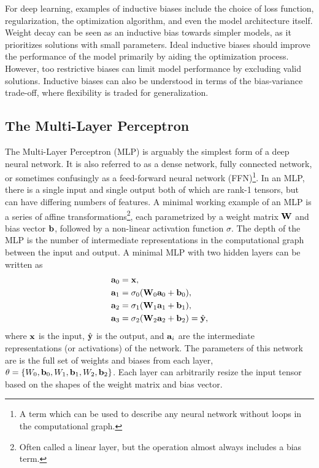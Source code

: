 For deep learning, examples of inductive biases include the choice of loss function, regularization, the optimization algorithm, and even the model architecture itself.
Weight decay can be seen as an inductive bias towards simpler models, as it prioritizes solutions with small parameters.
Ideal inductive biases should improve the performance of the model primarily by aiding the optimization process.
However, too restrictive biases can limit model performance by excluding valid solutions.
Inductive biases can also be understood in terms of the bias-variance trade-off, where flexibility is traded for generalization.

\subsection{The Multi-Layer Perceptron}

The Multi-Layer Perceptron (MLP) is arguably the simplest form of a deep neural network.
It is also referred to as a dense network, fully connected network, or sometimes confusingly as a feed-forward neural network (FFN)\footnote{A term which can be used to describe any neural network without loops in the computational graph.}.
In an MLP, there is a single input and single output both of which are rank-1 tensors, but can have differing numbers of features.
A minimal working example of an MLP is a series of affine transformations\footnote{Often called a linear layer, but the operation almost always includes a bias term.}, each parametrized by a weight matrix $\mathbf{W}$ and bias vector $\mathbf{b}$, followed by a non-linear activation function $\sigma$.
The depth of the MLP is the number of intermediate representations in the computational graph between the input and output.
A minimal MLP with two hidden layers can be written as
\begin{align}
    \mathbf{a}_0 & = \mathbf{x},                                        \\
    \mathbf{a}_1 & = \sigma_0(\mathbf{W}_0 \mathbf{a}_0 + \mathbf{b}_0),            \\
    \mathbf{a}_2 & = \sigma_1(\mathbf{W}_1 \mathbf{a}_1 + \mathbf{b}_1),            \\
    \mathbf{a}_3 & = \sigma_2(\mathbf{W}_2 \mathbf{a}_2 + \mathbf{b}_2) = \hat{\mathbf{y}},
\end{align}
where $\mathbf{x}$ is the input, $\hat{\mathbf{y}}$ is the output, and $\mathbf{a}_i$ are the intermediate representations (or activations) of the network.
The parameters of this network are is the full set of weights and biases from each layer, $\theta = \{W_0, \mathbf{b}_0, W_1, \mathbf{b}_1, W_2, \mathbf{b}_2\}$.
Each layer can arbitrarily resize the input tensor based on the shapes of the weight matrix and bias vector.

